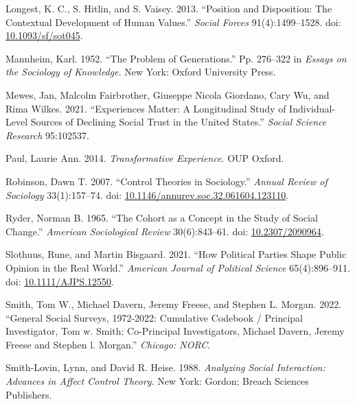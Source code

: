 \documentclass[
  11pt,
]{article}
\newlength{\cslhangindent}
\newlength{\cslentryspacingunit} %
\newenvironment{CSLReferences}[2] %
 {%
  \setlength{\parindent}{0pt}
  \ifodd #1
  \let\oldpar\par
  \def\par{\hangindent=\cslhangindent\oldpar}
  \fi
  \setlength{\parskip}{#2\cslentryspacingunit}
 }%
 {}
\begin{document}
\begin{CSLReferences}{1}{0}
\leavevmode{}%
Longest, K. C., S. Hitlin, and S. Vaisey. 2013. {``Position and
{Disposition}: {The} {Contextual} {Development} of {Human} {Values}.''}
\emph{Social Forces} 91(4):1499--1528. doi:
\href{https://doi.org/10.1093/sf/sot045}{10.1093/sf/sot045}.

\leavevmode{}%
Mannheim, Karl. 1952. {``The {Problem} of {Generations}.''} Pp. 276--322
in \emph{Essays on the {Sociology} of {Knowledge}}. New York: Oxford
University Press.

\leavevmode{}%
Mewes, Jan, Malcolm Fairbrother, Giuseppe Nicola Giordano, Cary Wu, and
Rima Wilkes. 2021. {``Experiences Matter: A Longitudinal Study of
Individual-Level Sources of Declining Social Trust in the United
States.''} \emph{Social Science Research} 95:102537.

\leavevmode{}%
Paul, Laurie Ann. 2014. \emph{Transformative Experience}. OUP Oxford.

\leavevmode{}%
Robinson, Dawn T. 2007. {``Control {Theories} in {Sociology}.''}
\emph{Annual Review of Sociology} 33(1):157--74. doi:
\href{https://doi.org/10.1146/annurev.soc.32.061604.123110}{10.1146/annurev.soc.32.061604.123110}.

\leavevmode{}%
Ryder, Norman B. 1965. {``The {Cohort} as a {Concept} in the {Study} of
{Social} {Change}.''} \emph{American Sociological Review} 30(6):843--61.
doi: \href{https://doi.org/10.2307/2090964}{10.2307/2090964}.

\leavevmode{}%
Slothuus, Rune, and Martin Bisgaard. 2021. {``How {Political} {Parties}
{Shape} {Public} {Opinion} in the {Real} {World}.''} \emph{American
Journal of Political Science} 65(4):896--911. doi:
\href{https://doi.org/10.1111/AJPS.12550}{10.1111/AJPS.12550}.

\leavevmode{}%
Smith, Tom W., Michael Davern, Jeremy Freese, and Stephen L. Morgan.
2022. {``General Social Surveys, 1972-2022: Cumulative Codebook /
Principal Investigator, Tom w. Smith; Co-Principal Investigators,
Michael Davern, Jeremy Freese and Stephen l. Morgan.''} \emph{Chicago:
NORC}.

\leavevmode{}%
Smith-Lovin, Lynn, and David R. Heise. 1988. \emph{Analyzing {Social}
{Interaction}: {Advances} in {Affect} {Control} {Theory}}. New York:
Gordon; Breach Sciences Publishers.


\end{CSLReferences}
\end{document}
